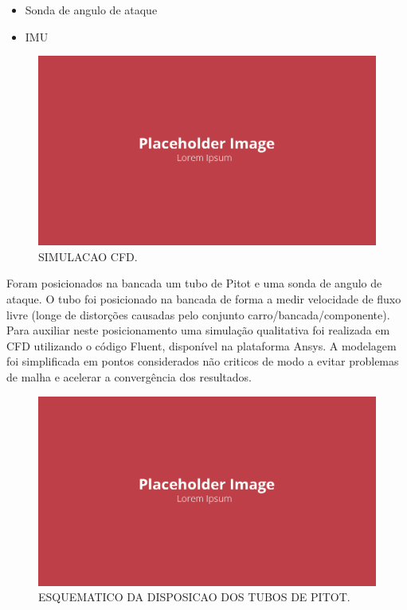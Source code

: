 \begin{itemize}
    \item Sonda de angulo de ataque
    \item IMU
\end{itemize}

\begin{figure}[!ht]
    \centering
    \includegraphics[width=.8\linewidth]{figuras/placeholder.png}
    \caption{SIMULACAO CFD\cite{autor}.}
    \label{fig:placeholder}
\end{figure}

Foram posicionados na bancada um tubo de Pitot e uma sonda de angulo de ataque. O tubo foi posicionado na bancada de forma a medir velocidade de fluxo livre (longe de distorções causadas pelo conjunto carro/bancada/componente). Para auxiliar neste posicionamento uma simulação qualitativa foi realizada em CFD utilizando o código Fluent, disponível na plataforma Ansys. A modelagem foi simplificada em pontos considerados não criticos de modo a evitar problemas de malha e acelerar a convergência dos resultados.

\begin{figure}[!ht]
    \centering
    \includegraphics[width=.8\linewidth]{figuras/placeholder.png}
    \caption{ESQUEMATICO DA DISPOSICAO DOS TUBOS DE PITOT\cite{autor}.}
    \label{fig:placeholder}
\end{figure}

